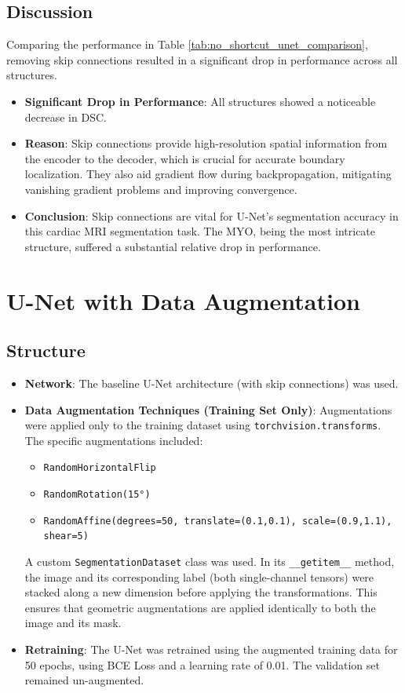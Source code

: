 \documentclass{article}
\begin{document}
\subsection{Discussion}
Comparing the performance in Table \ref{tab:no_shortcut_unet_comparison}, removing skip connections resulted in a significant drop in performance across all structures.
\begin{itemize}
  \item \textbf{Significant Drop in Performance}: All structures showed a noticeable decrease in DSC.
  \item \textbf{Reason}: Skip connections provide high-resolution spatial information from the encoder to the decoder, which is crucial for accurate boundary localization. They also aid gradient flow during backpropagation, mitigating vanishing gradient problems and improving convergence.
  \item \textbf{Conclusion}: Skip connections are vital for U-Net's segmentation accuracy in this cardiac MRI segmentation task. The MYO, being the most intricate structure, suffered a substantial relative drop in performance.
\end{itemize}


\section{U-Net with Data Augmentation}

\subsection{Structure}
\begin{itemize}
  \item \textbf{Network}: The baseline U-Net architecture (with skip connections) was used.
  \item \textbf{Data Augmentation Techniques (Training Set Only)}: Augmentations were applied only to the training dataset using \texttt{torchvision.transforms}. The specific augmentations included:
        \begin{itemize}
          \item \texttt{RandomHorizontalFlip}
          \item \texttt{RandomRotation(15°)}
          \item \texttt{RandomAffine(degrees=50, translate=(0.1,0.1), scale=(0.9,1.1), shear=5)}
        \end{itemize}
        A custom \texttt{SegmentationDataset} class was used. In its \texttt{\_\_getitem\_\_} method,
        the image and its corresponding label (both single-channel tensors) were stacked along a new dimension before applying the
        transformations. This ensures that geometric augmentations are applied identically to both the image and its mask.
  \item \textbf{Retraining}: The U-Net was retrained using the augmented training data for 50 epochs, using BCE Loss and a learning rate of 0.01.
        The validation set remained un-augmented.
\end{itemize}
\end{document}
